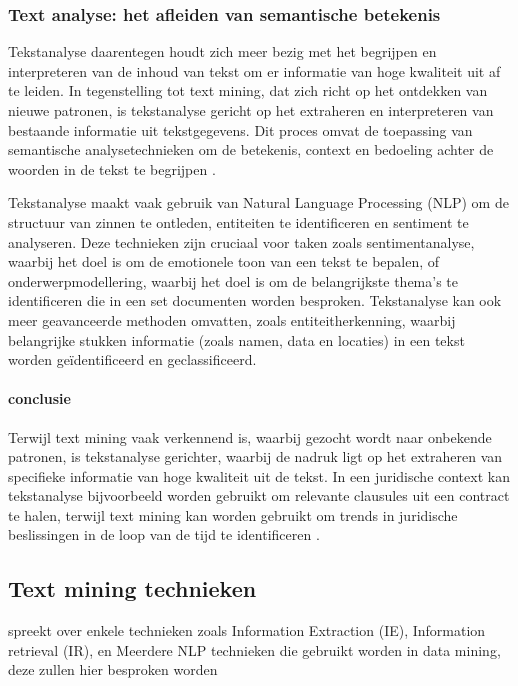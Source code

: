 \subsubsection{Text analyse: het afleiden van semantische betekenis}
Tekstanalyse daarentegen houdt zich meer bezig met het begrijpen en interpreteren van de inhoud van tekst om er informatie van hoge kwaliteit uit af te leiden. In tegenstelling tot text mining, dat zich richt op het ontdekken van nieuwe patronen, is tekstanalyse gericht op het extraheren en interpreteren van bestaande informatie uit tekstgegevens. Dit proces omvat de toepassing van semantische analysetechnieken om de betekenis, context en bedoeling achter de woorden in de tekst te begrijpen \autocite{gaikwad2014text}.

Tekstanalyse maakt vaak gebruik van Natural Language Processing (NLP) om de structuur van zinnen te ontleden, entiteiten te identificeren en sentiment te analyseren. Deze technieken zijn cruciaal voor taken zoals sentimentanalyse, waarbij het doel is om de emotionele toon van een tekst te bepalen, of onderwerpmodellering, waarbij het doel is om de belangrijkste thema's te identificeren die in een set documenten worden besproken. Tekstanalyse kan ook meer geavanceerde methoden omvatten, zoals entiteitherkenning, waarbij belangrijke stukken informatie (zoals namen, data en locaties) in een tekst worden geïdentificeerd en geclassificeerd.

\paragraph{conclusie}
Terwijl text mining vaak verkennend is, waarbij gezocht wordt naar onbekende patronen, is tekstanalyse gerichter, waarbij de nadruk ligt op het extraheren van specifieke informatie van hoge kwaliteit uit de tekst. In een juridische context kan tekstanalyse bijvoorbeeld worden gebruikt om relevante clausules uit een contract te halen, terwijl text mining kan worden gebruikt om trends in juridische beslissingen in de loop van de tijd te identificeren \autocite{gaikwad2014text}.

\subsection{Text mining technieken}
\autocite{Talib2016TextMining} spreekt over enkele technieken zoals Information Extraction (IE), Information retrieval (IR), en Meerdere NLP technieken die gebruikt worden in data mining, deze zullen hier besproken worden

